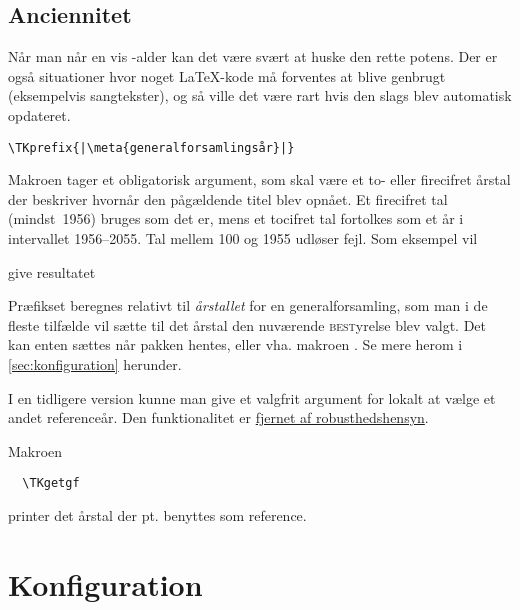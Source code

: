 \documentclass[a4paper,article,oneside]{memoir}
\newenvironment{resultat}{%
  \begin{adjustwidth}{15mm}{15mm}%
    \begin{qshade}%
    }{%
    \end{qshade}%
  \end{adjustwidth}}
\begin{document}

\subsection{Anciennitet}
\label{sec:anciennitet}

Når man når en vis \TK-alder kan det være svært at huske den rette
potens. Der er også situationer hvor noget \LaTeX-kode må forventes at
blive genbrugt (eksempelvis sangtekster), og så ville det være rart
hvis den slags blev automatisk opdateret.

\begin{lstlisting}[escapechar=|]
  \TKprefix{|\meta{generalforsamlingsår}|}
\end{lstlisting}

Makroen  tager et obligatorisk argument, som skal være et
to- eller firecifret årstal der beskriver hvornår den pågældende titel
blev opnået. Et firecifret tal (mindst~1956) bruges som det er, mens
et tocifret tal fortolkes som et år i intervallet 1956--2055. Tal
mellem 100 og 1955 udløser fejl. Som eksempel vil


give resultatet

\begin{resultat}

\end{resultat}

Præfikset beregnes relativt til \emph{årstallet} for en
generalforsamling, som man i de fleste tilfælde vil sætte til det
årstal den nuværende \textsc{best}yrelse blev valgt. Det kan enten
sættes når pakken hentes, eller vha. makroen . Se mere
herom i \autoref{sec:konfiguration} herunder.

I en tidligere version kunne man give  et valgfrit
argument for lokalt at vælge et andet referenceår. Den funktionalitet
er \hyperref[sec:-og-]{fjernet af robusthedshensyn}.

Makroen
\begin{lstlisting}
  \TKgetgf
\end{lstlisting}
printer det årstal der pt. benyttes som reference.


\section{Konfiguration}
\label{sec:konfiguration}
\end{document}
